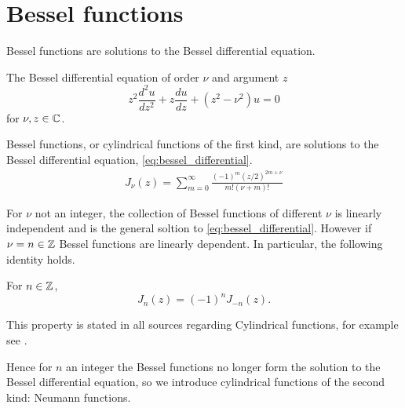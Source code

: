 %
\section{Bessel functions}
%
Bessel functions are solutions to the Bessel differential equation.
%
  \begin{defn}The Bessel differential equation of order $\nu$ and argument $z$
    \begin{equation}\label{eq:bessel_differential}
        z^2 \frac{d^2 u}{dz^2} + z\frac{du}{dz} + (z^2 - \nu^2)u = 0
    \end{equation}
  for $\nu, z \in \mathbb{C}$.
  \end{defn}\par
%
  \begin{defn}\label{defn:bessel_func}
  Bessel functions, or cylindrical functions of the first kind, are solutions to the Bessel differential equation, \eqref{eq:bessel_differential}.
    \begin{align*}
        J_\nu(z) = \sum^\infty_{m=0} \frac{
        (-1)^m (z/2)^{2m+\nu} }{
        m! (\nu+m)! }
    \end{align*}
  \end{defn}
%
For $\nu$ not an integer, the collection of Bessel functions of different $\nu$ is linearly independent and is the general soltion to \ref{eq:bessel_differential}. However if $\nu = n \in \mathbb{Z}$ Bessel functions are linearly dependent. In particular, the following identity holds.
%
  \begin{propn} \label{propn:bessel_int_order_identity} For $n \in \mathbb{Z}$,
    \begin{equation}
      J_n(z) = (-1)^n J_{-n}(z).
    \end{equation}

  \end{propn}\par
%
This property is stated in all sources regarding Cylindrical functions, for example see \cite{culham04bessel, karmazina19cylinderfunc, korenev02bessel_func}.\par
%
Hence for $n$ an integer the Bessel functions no longer form the solution to the Bessel differential equation, so we introduce cylindrical functions of the second kind: Neumann functions.
